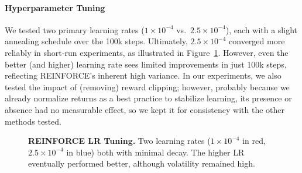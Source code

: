 \paragraph{Hyperparameter Tuning}
We tested two primary learning rates ($1\times10^{-4}$ vs.\ $2.5\times10^{-4}$), each with a slight annealing schedule over the 100k steps. 
Ultimately, $2.5\times10^{-4}$ converged more reliably in short‐run experiments, as illustrated in Figure~\ref{fig:reinforce_lr_tuning}. 
However, even the better (and higher) learning rate sees limited improvements in just 100k steps, reflecting REINFORCE’s inherent high variance.
In our experiments, we also tested the impact of (removing) reward clipping; however, probably because we already normalize returns as a best practice to stabilize learning, its presence or absence had no measurable effect, so we kept it for consistency with the other methods tested.
\begin{figure}
	\centering
	\quad
	\caption{\textbf{REINFORCE LR Tuning.} Two learning rates ($1\times10^{-4}$ in red, $2.5\times10^{-4}$ in blue) 
		both with minimal decay. The higher LR eventually performed better, although volatility remained high.}
	\label{fig:reinforce_lr_tuning}
\end{figure}


